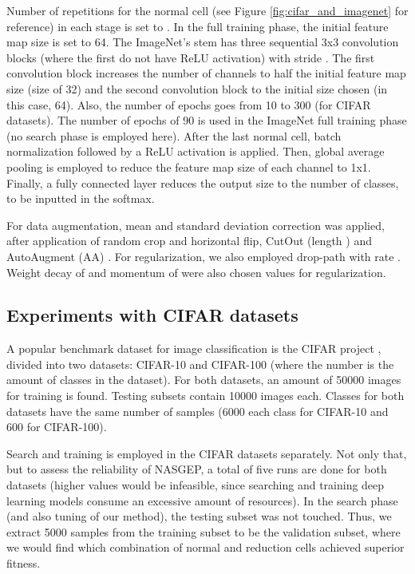 \documentclass[conference]{IEEEtran}
\begin{document}
	Number of repetitions for the normal cell (see Figure \ref{fig:cifar_and_imagenet} for reference) in each stage is set to .
	In the full training phase, the initial feature map size is set to 64.
	The ImageNet's stem has three sequential 3x3 convolution blocks (where the first do not have ReLU activation) with stride .
	The first convolution block increases the number of channels to half the initial feature map size (size of 32) and the second convolution block to the initial size chosen (in this case, 64).
	Also, the number of epochs goes from 10 to 300 (for CIFAR datasets).
	The number of epochs of 90 is used in the ImageNet full training phase (no search phase is employed here).
	After the last normal cell, batch normalization followed by a ReLU activation is applied. 
	Then, global average pooling is employed to reduce the feature map size of each channel to 1x1.
	Finally, a fully connected layer reduces the output size to the number of classes, to be inputted in the softmax. 
	
	For data augmentation, mean and standard deviation correction was applied, after application of random crop and horizontal flip, CutOut \cite{devries2017improved} (length ) and AutoAugment (AA) \cite{cubuk2018autoaugment}. For regularization, we also employed drop-path \cite{larsson2016fractalnet} with rate .  
	Weight decay of  and momentum of  were also chosen values for regularization.
	
	\subsection{Experiments with CIFAR datasets}
	
	A popular benchmark dataset for image classification is the CIFAR project \cite{krizhevsky2009learning}, divided into two datasets: CIFAR-10 and CIFAR-100 (where the number is the amount of classes in the dataset).
	For both datasets, an amount of 50000 images for training is found. Testing subsets contain 10000 images each. Classes for both datasets have the same number of samples (6000 each class for CIFAR-10 and 600 for CIFAR-100).
	
	Search and training is employed in the CIFAR datasets separately.
	Not only that, but to assess the reliability of NASGEP, a total of five runs are done for both datasets (higher values would be infeasible, since searching and training deep learning models consume an excessive amount of resources).
	In the search phase (and also tuning of our method), the testing subset was not touched. 
	Thus, we extract 5000 samples from the training subset to be the validation subset, where we would find which combination of normal and reduction cells achieved superior fitness.
	
\end{document}

